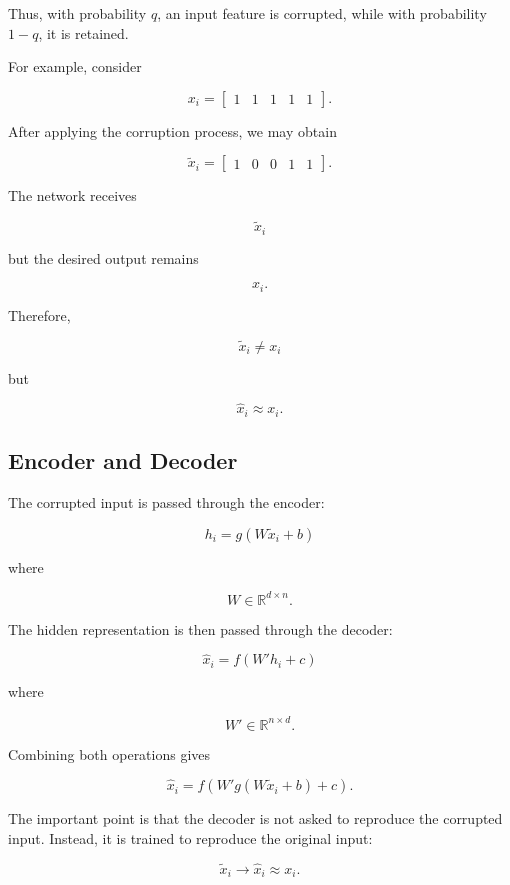 \documentclass{article}
\begin{document}
Thus, with probability \(q\), an input feature is corrupted, while with
probability \(1-q\), it is retained.

For example, consider

\[
x_i=
\begin{bmatrix}
	1&1&1&1&1
\end{bmatrix}.
\]

After applying the corruption process, we may obtain

\[
\widetilde{x}_i=
\begin{bmatrix}
	1&0&0&1&1
\end{bmatrix}.
\]

The network receives

\[
\widetilde{x}_i
\]

but the desired output remains

\[
x_i.
\]

Therefore,

\[
\boxed{
	\widetilde{x}_i
	\neq
	x_i
}
\]

but

\[
\boxed{
	\widehat{x}_i
	\approx
	x_i.
}
\]


\subsection{Encoder and Decoder}

The corrupted input is passed through the encoder:

\[
\boxed{
	h_i=g(W\widetilde{x}_i+b)
}
\]

where

\[
W\in\mathbb{R}^{d\times n}.
\]

The hidden representation is then passed through the decoder:

\[
\boxed{
	\widehat{x}_i
	=
	f(W'h_i+c)
}
\]

where

\[
W'\in\mathbb{R}^{n\times d}.
\]

Combining both operations gives

\[
\widehat{x}_i
=
f\left(
W'g(W\widetilde{x}_i+b)+c
\right).
\]

The important point is that the decoder is not asked to reproduce the
corrupted input. Instead, it is trained to reproduce the original
input:

\[
\boxed{
	\widetilde{x}_i
	\longrightarrow
	\widehat{x}_i
	\approx
	x_i.
}
\]
\end{document}
